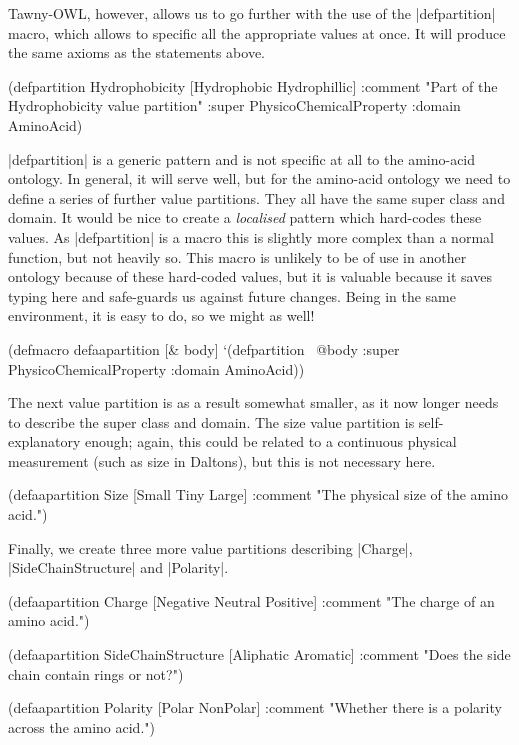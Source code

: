 Tawny-OWL, however, allows us to go further with the use of the |defpartition|
macro, which allows to specific all the appropriate values at once. It will
produce the same axioms as the statements above.

\begin{tawny}
(defpartition Hydrophobicity
  [Hydrophobic Hydrophillic]
  :comment "Part of the Hydrophobicity value partition"
  :super PhysicoChemicalProperty
  :domain AminoAcid)
\end{tawny}

|defpartition| is a generic pattern and is not specific at all to the
amino-acid ontology. In general, it will serve well, but for the amino-acid
ontology we need to define a series of further value partitions. They all have
the same super class and domain. It would be nice to create a \emph{localised}
pattern which hard-codes these values. As |defpartition| is a macro this is
slightly more complex than a normal function, but not heavily so. This macro
is unlikely to be of use in another ontology because of these hard-coded
values, but it is valuable because it saves typing here and safe-guards us
against future changes. Being in the same environment, it is easy to do, so we
might as well!

\begin{tawny}
(defmacro defaapartition [& body]
  `(defpartition
     ~@body :super PhysicoChemicalProperty
     :domain AminoAcid))
\end{tawny}

The next value partition is as a result somewhat smaller, as it now longer
needs to describe the super class and domain. The size value partition is
self-explanatory enough; again, this could be related to a continuous physical
measurement (such as size in Daltons), but this is not necessary here.

\begin{tawny}
(defaapartition Size
  [Small Tiny Large]
  :comment "The physical size of the amino acid.")
\end{tawny}

Finally, we create three more value partitions describing |Charge|,
|SideChainStructure| and |Polarity|.

\begin{tawny}
(defaapartition Charge
  [Negative Neutral Positive]
  :comment "The charge of an amino acid.")

(defaapartition SideChainStructure
  [Aliphatic Aromatic]
  :comment "Does the side chain contain rings or not?")

(defaapartition Polarity
  [Polar NonPolar]
  :comment "Whether there is a polarity across the amino acid.")
\end{tawny}

